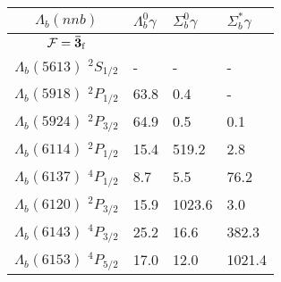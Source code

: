 \begin{tabular}{c |  p{0.65cm}  p{0.65cm}  p{0.65cm}} \hline \hline
$\Lambda_b(nnb)$  & $\Lambda_{b}^{0} \gamma$  & $\Sigma_{b}^{0} \gamma$  & $\Sigma_{b}^{*} \gamma$  \\ \hline
$\mathcal{F}={\bf {\bar{3}}}_{\rm f}$&&&\\ \hline
$\Lambda_b(5613)$ $^{2}S_{1/2}$&-  &-  &- \\
$\Lambda_b(5918)$ $^{2}P_{1/2}$&63.8  &0.4  &- \\
$\Lambda_b(5924)$ $^{2}P_{3/2}$&64.9  &0.5  &0.1 \\
$\Lambda_b(6114)$ $^{2}P_{1/2}$&15.4  &519.2  &2.8 \\
$\Lambda_b(6137)$ $^{4}P_{1/2}$&8.7  &5.5  &76.2 \\
$\Lambda_b(6120)$ $^{2}P_{3/2}$&15.9  &1023.6  &3.0 \\
$\Lambda_b(6143)$ $^{4}P_{3/2}$&25.2  &16.6  &382.3 \\
$\Lambda_b(6153)$ $^{4}P_{5/2}$&17.0  &12.0  &1021.4 \\
\hline \hline
\end{tabular}
